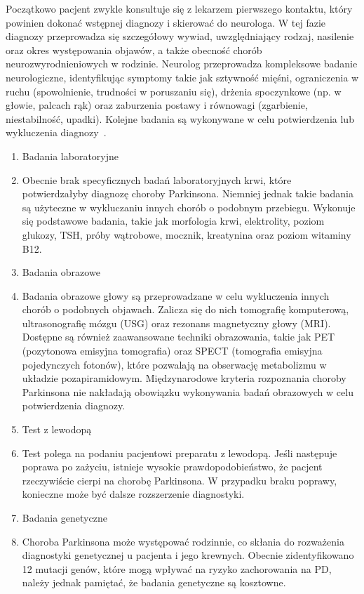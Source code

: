 Początkowo pacjent zwykle konsultuje się z lekarzem pierwszego kontaktu, który powinien dokonać wstępnej diagnozy i skierować do neurologa.
W tej fazie diagnozy przeprowadza się szczegółowy wywiad, uwzględniający rodzaj, nasilenie oraz okres występowania objawów, a także
obecność chorób neurozwyrodnieniowych w rodzinie.
Neurolog przeprowadza kompleksowe badanie neurologiczne, identyfikując symptomy takie jak sztywność mięśni, ograniczenia w
ruchu (spowolnienie, trudności w poruszaniu się), drżenia spoczynkowe (np.
w głowie, palcach rąk) oraz zaburzenia postawy i równowagi (zgarbienie, niestabilność, upadki).
Kolejne badania są wykonywane w celu potwierdzenia lub wykluczenia diagnozy~\cite{diagnostyka_Sitek, Loscalzo_2022}.

\renewcommand{\labelenumi}{\alph {enumi})}
\begin{enumerate}
	\item Badania laboratoryjne
	\item[] Obecnie brak specyficznych badań laboratoryjnych krwi, które potwierdzałyby diagnozę choroby Parkinsona.
Niemniej jednak takie badania są użyteczne w wykluczaniu innych chorób o podobnym przebiegu.
Wykonuje się podstawowe badania, takie jak morfologia krwi, elektrolity, poziom glukozy, TSH, próby wątrobowe, mocznik, kreatynina oraz poziom witaminy B12.

	\item Badania obrazowe
	\item[] Badania obrazowe głowy są przeprowadzane w celu wykluczenia innych chorób o podobnych objawach.
Zalicza się do nich tomografię komputerową, ultrasonografię mózgu (USG) oraz rezonans magnetyczny głowy (MRI).
Dostępne są również zaawansowane techniki obrazowania, takie jak PET (pozytonowa emisyjna tomografia) oraz SPECT (tomografia emisyjna pojedynczych fotonów), które pozwalają na obserwację metabolizmu w układzie pozapiramidowym.
Międzynarodowe kryteria rozpoznania choroby Parkinsona nie nakładają obowiązku wykonywania badań obrazowych w celu potwierdzenia diagnozy.

	\item Test z lewodopą
	\item[]Test polega na podaniu pacjentowi preparatu z lewodopą.
Jeśli następuje poprawa po zażyciu, istnieje wysokie prawdopodobieństwo, że pacjent rzeczywiście cierpi na chorobę Parkinsona.
W przypadku braku poprawy, konieczne może być dalsze rozszerzenie diagnostyki.

	\item Badania genetyczne
	\item[] Choroba Parkinsona może występować rodzinnie, co skłania do rozważenia diagnostyki genetycznej u pacjenta i jego krewnych.
Obecnie zidentyfikowano 12 mutacji genów, które mogą wpływać na ryzyko zachorowania na PD, należy jednak pamiętać, że badania genetyczne są kosztowne.


\end{enumerate}
